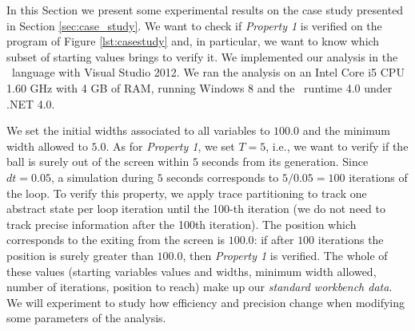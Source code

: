 In this Section we present some experimental results on the case study presented in Section \ref{sec:case_study}. We want to check if \emph{Property 1} is verified on the program of Figure \ref{lst:casestudy} and, in particular, we want to know which subset of starting values brings to verify it.
We implemented our analysis in the \FSharp\ language with Visual Studio 2012. We ran the analysis on an Intel Core i5 CPU 1.60 GHz with 4 GB of RAM, running Windows 8 and the \FSharp\ runtime 4.0 under .NET 4.0. 

We set the initial widths associated to all variables to $100.0$ and the minimum width allowed to $5.0$. As for \emph{Property 1}, we set $T = 5$, i.e., we want to verify if the ball is surely out of the screen within $5$ seconds from its generation. Since $dt=0.05$, a simulation during $5$ seconds corresponds to $5/0.05 = 100$ iterations of the  loop. To verify this property, we apply trace partitioning \cite{MR05} to track one abstract state per loop iteration until the 100-th iteration (we do not need to track precise information after the 100th iteration). The position which corresponds to the exiting from the screen is $100.0$: if after $100$ iterations the position  is surely greater than $100.0$, then \emph{Property 1} is verified. The whole of these values (starting variables values and widths, minimum width allowed, number of iterations, position to reach) make up our \emph{standard workbench data}. We will experiment to study how efficiency and precision change when modifying some parameters of the analysis.


